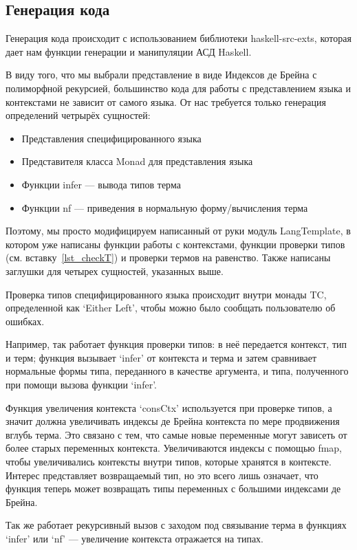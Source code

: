 \subsection{Генерация кода}
Генерация кода происходит с использованием библиотеки haskell-src-exts\cite{src_exts}, которая дает нам функции генерации и манипуляции АСД Haskell.

В виду того, что мы выбрали представление в виде Индексов де Брейна с полиморфной рекурсией, большинство кода для работы с представлением языка и контекстами не зависит от самого языка. От нас требуется только генерация определений четрырёх сущностей:

\begin{itemize}
\item Представления специфицированного языка
\item Представителя класса Monad для представления языка
\item Функции infer --- вывода типов терма
\item Функции nf --- приведения в нормальную форму/вычисления терма
\end{itemize}

Поэтому, мы просто модифицируем написанный от руки модуль LangTemplate, в котором уже написаны функции работы с контекстами, функции проверки типов (см. вставку~\ref{lst_checkT}) и проверки термов на равенство. Также написаны заглушки для четырех сущностей, указанных выше.

Проверка типов специфицированного языка происходит внутри монады TC, определенной как `Either Left', чтобы можно было сообщать пользователю об ошибках.

Например, так работает функция проверки типов: в неё передается контекст, тип и терм; функция вызывает `infer' от контекста и терма и затем сравнивает нормальные формы типа, переданного в качестве аргумента, и типа, полученного при помощи вызова функции `infer'.

Функция увеличения контекста `consCtx' используется при проверке типов, а значит должна увеличивать индексы де Брейна контекста по мере продвижения вглубь терма. Это связано с тем, что самые новые переменные могут зависеть от более старых переменных контекста. Увеличиваются индексы с помощью fmap, чтобы увеличивались контексты внутри типов, которые хранятся в контексте. Интерес представляет возвращаемый тип, но это всего лишь означает, что функция теперь может возвращать типы переменных с большими индексами де Брейна.

Так же работает рекурсивный вызов с заходом под связывание терма в функциях `infer' или `nf' --- увеличение контекста отражается на типах.

